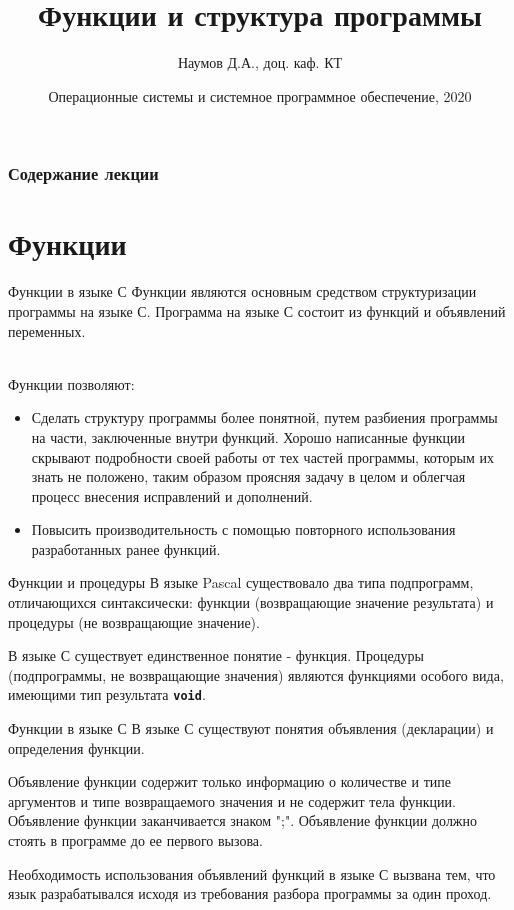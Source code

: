\documentclass{beamer}
\title[Язык C]{Функции и структура программы}
\author{Наумов Д.А., доц. каф. КТ}
\date[10.09.2020] {Операционные системы и системное программное обеспечение, 2020}
\begin{document}
\begin{frame}
  \titlepage
\end{frame}
  
\begin{frame}
  \frametitle{Содержание лекции}
  \tableofcontents  
\end{frame}

\section{Функции}

\begin{frame}{Функции в языке С}
    Функции являются основным средством структуризации программы на языке С. Программа на языке С состоит из функций и объявлений переменных.
    
    \\
    Функции позволяют:
    \begin{itemize}
        \item Сделать структуру программы более понятной, путем разбиения программы на части, заключенные внутри функций. Хорошо написанные функции скрывают подробности своей работы от тех частей программы, которым их знать не положено, таким образом проясняя задачу в целом и облегчая процесс внесения исправлений и дополнений.
        \item Повысить производительность с помощью повторного использования разработанных ранее функций.
    \end{itemize}
\end{frame}

\begin{frame}{Функции и процедуры}
    В языке Pascal существовало два типа подпрограмм, отличающихся синтаксически: функции (возвращающие значение результата) и процедуры (не возвращающие значение).
    
    В языке С существует единственное понятие - функция. Процедуры (подпрограммы, не возвращающие значения) являются функциями особого вида, имеющими тип результата \textbf{\texttt{void}}.
\end{frame}


\begin{frame}{Функции в языке С}
    В языке С существуют понятия объявления (декларации) и определения функции.
    
    Объявление функции содержит только информацию о количестве и типе аргументов и типе возвращаемого значения и не содержит тела функции. Объявление функции заканчивается знаком ";". Объявление функции должно стоять в программе до ее первого вызова. 
    
    Необходимость использования объявлений функций в языке С вызвана тем, что язык разрабатывался исходя из требования разбора программы за один проход.
\end{frame}
\end{document}
